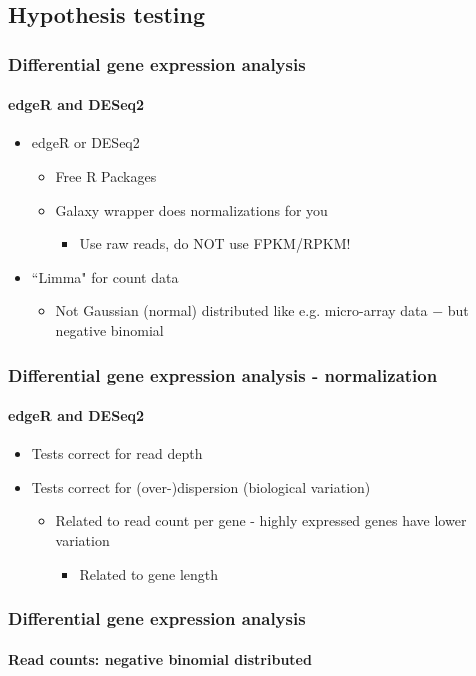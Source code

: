 \documentclass{beamer}			  %
\begin{document}
\subsection{Hypothesis testing}

\begin{frame}
	\frametitle{Differential gene expression analysis}
	\framesubtitle{edgeR and DESeq2}
	\begin{itemize}
			\item edgeR or DESeq2\cite{edger,deseq2}
		\begin{itemize}
			\item Free R Packages
		\item Galaxy wrapper does normalizations for you
		\begin{itemize}
			\item Use raw reads, do NOT use FPKM/RPKM!
		\end{itemize}
	\end{itemize}
		\item ``Limma" for count data
		\begin{itemize}
			\item Not Gaussian (normal) distributed like e.g. micro-array data $-$ but negative binomial 
		\end{itemize}
	\end{itemize}
\end{frame}

\begin{frame}
	\frametitle{Differential gene expression analysis - normalization}
	\framesubtitle{edgeR and DESeq2}
	\begin{itemize}
		\item Tests correct for read depth
		\item Tests correct for (over-)dispersion (biological variation)
		\begin{itemize}
			\item Related to read count per gene - highly expressed genes have lower variation
			\begin{itemize}
				\item Related to gene length
			\end{itemize}
		\end{itemize}
	\end{itemize}
\end{frame}

\begin{frame}
\frametitle{Differential gene expression analysis}
\framesubtitle{Read counts: negative binomial distributed}
	\begin{figure}
	\end{figure}
\end{frame}
\end{document}
